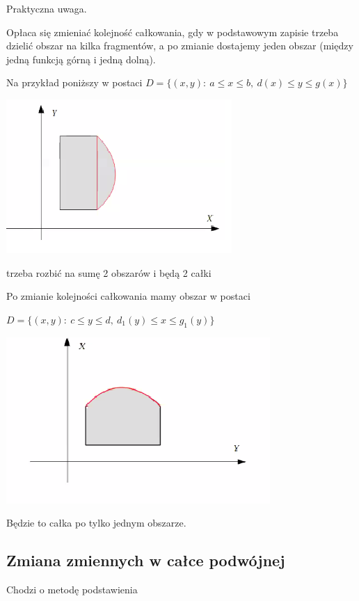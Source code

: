 Praktyczna uwaga.

Opłaca się zmieniać kolejność całkowania, gdy w podstawowym zapisie trzeba dzielić obszar na kilka fragmentów, a po zmianie dostajemy jeden
obszar (między jedną funkcją górną i jedną dolną).
\begin{przyklad}
    Na przykład poniższy w postaci $ D = \{(x,y): \ a \leq x \leq b, \ d(x) \leq y \leq g(x) \} $
    
    \includegraphics[scale=0.65]{img/obszar1.png}

    trzeba rozbić na sumę 2 obszarów i będą 2 całki

    Po zmianie kolejności całkowania mamy obszar w postaci

    $ D = \{(x,y): \ c \leq y \leq d, \ d_1(y) \leq x \leq g_1(y) \} $

    \includegraphics[scale=0.6]{img/obszar2.png}

    Będzie to całka po tylko jednym obszarze.
\end{przyklad}

\subsection*{Zmiana zmiennych w całce podwójnej}

Chodzi o metodę podstawienia

